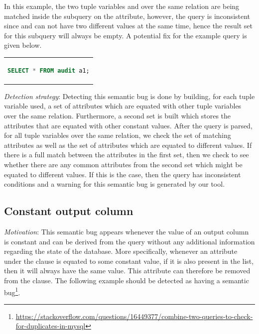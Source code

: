 In this example, the two tuple variables  and  over the same relation  are being matched inside the  subquery on the  attribute, however, the query is inconsistent since  and  can not have two different values at the same time, hence the result set for this subquery will always be empty. A potential fix for the example query is given below.

\begin{center}
\begin{tabular}{c}
\begin{lstlisting}[language=SQL]
SELECT * FROM audit a1;
\end{lstlisting}
\end{tabular}
\end{center}

\noindent \emph{Detection strategy}: Detecting this semantic bug is done by building, for each tuple variable used, a set of attributes which are equated with other tuple variables over the same relation. Furthermore, a second set is built which stores the attributes that are equated with other constant values. After the query is parsed, for all tuple variables over the same relation, we check the set of matching attributes as well as the set of attributes which are equated to different values. If there is a full match between the attributes in the first set, then we check to see whether there are any common attributes from the second set which might be equated to different values. If this is the case, then the query has inconsistent conditions and a warning for this semantic bug is generated by our tool.

\subsection{Constant output column}
\emph{Motivation}: This semantic bug appears whenever the value of an output column is constant and can be derived from the query without any additional information regarding the state of the database. More specifically, whenever an attribute under the  clause is equated to some constant value, if it is also present in the  list, then it will always have the same value. This attribute can therefore be removed from the  clause. The following example should be detected as having a semantic bug\footnote{\url{https://stackoverflow.com/questions/16449377/combine-two-queries-to-check-for-duplicates-in-mysql}}.

